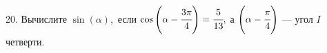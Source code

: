 20. Вычислите $\sin(\alpha),$ если $\cos\left(\alpha-\cfrac{3\pi}{4}\right)=\cfrac{5}{13},$ а $\left(\alpha-\cfrac{\pi}{4}\right)$ --- угол $I$ четверти.\\
